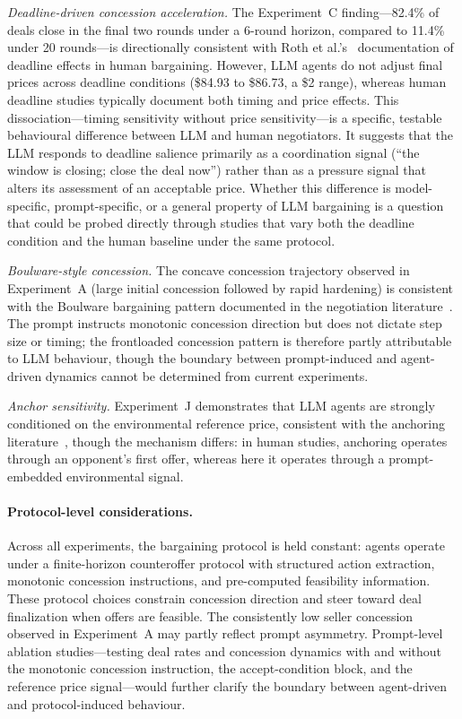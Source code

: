 \emph{Deadline-driven concession acceleration.}  The Experiment~C finding---82.4\% of deals close in the final two rounds under a 6-round horizon, compared to 11.4\% under 20 rounds---is directionally consistent with Roth et al.'s~\cite{roth1988deadline} documentation of deadline effects in human bargaining.  However, LLM agents do not adjust final prices across deadline conditions (\$84.93 to \$86.73, a \$2 range), whereas human deadline studies typically document both timing and price effects.  This dissociation---timing sensitivity without price sensitivity---is a specific, testable behavioural difference between LLM and human negotiators.  It suggests that the LLM responds to deadline salience primarily as a coordination signal (``the window is closing; close the deal now'') rather than as a pressure signal that alters its assessment of an acceptable price.  Whether this difference is model-specific, prompt-specific, or a general property of LLM bargaining is a question that could be probed directly through studies that vary both the deadline condition and the human baseline under the same protocol.

\emph{Boulware-style concession.}  The concave concession trajectory observed in Experiment~A (large initial concession followed by rapid hardening) is consistent with the Boulware bargaining pattern documented in the negotiation literature~\cite{raiffa1982}.  The prompt instructs monotonic concession direction but does not dictate step size or timing; the frontloaded concession pattern is therefore partly attributable to LLM behaviour, though the boundary between prompt-induced and agent-driven dynamics cannot be determined from current experiments.

\emph{Anchor sensitivity.}  Experiment~J demonstrates that LLM agents are strongly conditioned on the environmental reference price, consistent with the anchoring literature~\cite{tversky1974,galinsky2001}, though the mechanism differs: in human studies, anchoring operates through an opponent's first offer, whereas here it operates through a prompt-embedded environmental signal.

\paragraph{Protocol-level considerations.}
Across all experiments, the bargaining protocol is held constant: agents operate under a finite-horizon counteroffer protocol with structured action extraction, monotonic concession instructions, and pre-computed feasibility information.  These protocol choices constrain concession direction and steer toward deal finalization when offers are feasible.  The consistently low seller concession observed in Experiment~A may partly reflect prompt asymmetry.  Prompt-level ablation studies---testing deal rates and concession dynamics with and without the monotonic concession instruction, the accept-condition block, and the reference price signal---would further clarify the boundary between agent-driven and protocol-induced behaviour.

